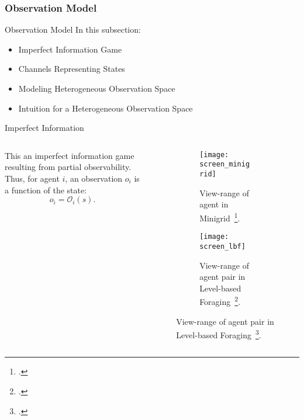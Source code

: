 \subsubsection{Observation Model}

\begin{frame}{Observation Model}
    In this subsection:
    \begin{itemize}
        \item Imperfect Information Game
        \item Channels Representing States
        \item Modeling Heterogeneous Observation Space
        \item Intuition for a Heterogeneous Observation Space
    \end{itemize}
\end{frame}

\begin{frame}{Imperfect Information}
    \begin{columns}
        \begin{column}{0.4\linewidth}
            This an imperfect information game resulting from partial observability.
            \\[1em]
            Thus, for agent \(i\), an observation \(o_i\) is a function of the state:
            \[o_i = \mathcal{O}_i(s) .\]
        \end{column}
        \begin{column}{0.5\linewidth}
            \begin{figure}
                \begin{subfigure}[t]{0.45\textwidth}
                    \texttt{[image: screen\_minigrid]}
                    \caption{View-range of agent in Minigrid~\footcite{chevalier-boisvert2023}.}
                \end{subfigure}
                \hfill
                \begin{subfigure}[t]{0.45\textwidth}
                    \texttt{[image: screen\_lbf]}
                    \caption{View-range of agent pair in Level-based Foraging~\footcite{papoudakis2021}.}
                \end{subfigure}
            \end{figure}
        \end{column}
    \end{columns}
\end{frame}

